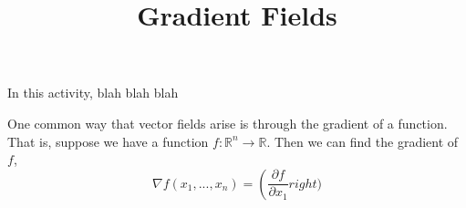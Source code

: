 \documentclass{ximera}
\title{Gradient Fields}
\begin{document}
\begin{abstract}
\end{abstract}
\maketitle

In this activity, blah blah blah


One common way that vector fields arise is through the gradient of a function. That is, suppose we have a function $f:\mathbb{R}^n\rightarrow\mathbb{R}$. Then we can find the gradient of $f$,
\[
\nabla f(x_1,...,x_n) =\left(\dfrac{\partial f}{\partial x_1} right)
\]
\end{document}
